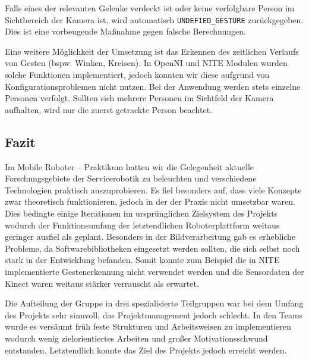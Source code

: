 Falls eines der relevanten Gelenke verdeckt ist oder keine verfolgbare Person im
Sichtbereich der Kamera ist, wird automatisch \lstinline{UNDEFIED_GESTURE}
zurückgegeben. Dies ist eine vorbeugende Maßnahme gegen falsche Berechnungen.

Eine weitere Möglichkeit der Umsetzung ist das Erkennen des zeitlichen Verlaufs von Gesten (bspw. Winken, Kreisen).
 In OpenNI und NITE Modulen wurden solche Funktionen implementiert, jedoch konnten wir diese aufgrund von Konfigurationsproblemen nicht nutzen.
Bei der Anwendung werden stets einzelne Personen verfolgt. Sollten sich mehrere Personen im Sichtfeld der Kamera aufhalten, wird nur die zuerst getrackte Person beachtet.

\subsection{Fazit}
Im Mobile Roboter -- Praktikum hatten wir die Gelegenheit aktuelle
 Forschungsgebiete der Servicerobotik zu beleuchten und verschiedene
 Technologien praktisch auszuprobieren. Es fiel besonders auf, dass viele Konzepte zwar theoretisch funktionieren,
 jedoch in der der Praxis nicht umsetzbar waren. Dies bedingte einige Iterationen im ursprünglichen Zielsystem des Projekts
 wodurch der Funktionsumfang der letztendlichen Roboterplattform weitaus geringer ausfiel als geplant.
 Besonders in der Bildverarbeitung gab es erhebliche Probleme, da Softwarebibliotheken eingesetzt werden sollten,
 die sich selbst noch stark in der Entwicklung befanden. Somit konnte zum Beispiel die in NITE implementierte Gestenerkennung
 nicht verwendet werden und die Sensordaten der Kinect waren weitaus stärker verrauscht als erwartet.
 
Die Aufteilung der Gruppe in drei spezialisierte Teilgruppen war bei dem Umfang des Projekts sehr sinnvoll,
 das Projektmanagement jedoch schlecht. In den Teams wurde es versäumt früh feste Strukturen und Arbeitsweisen zu implementieren wodurch
 wenig zielorientiertes Arbeiten und großer Motivationsschwund entstanden. Letztendlich konnte das Ziel des Projekts jedoch erreicht werden.
